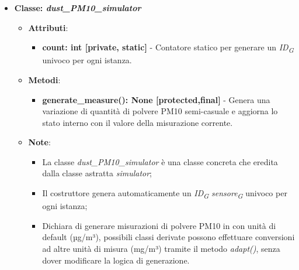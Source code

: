 \begin{itemize}
    \item{\textbf{Classe: \textit{dust\_PM10\_simulator}}}
    \begin{itemize}
        \item \textbf{Attributi}: 
        \begin{itemize}
            \item \textbf{count: int [private, static]} - Contatore statico per generare un \textit{ID}\textsubscript{\textit{G}} univoco per ogni istanza.
        \end{itemize}
        \item \textbf{Metodi}: 
        \begin{itemize}
            \item \textbf{generate\_measure(): None [protected,final]} - Genera una variazione di quantità di polvere PM10 semi-casuale e aggiorna lo stato interno con il valore della misurazione corrente.
        \end{itemize}
        \item \textbf{Note}:
        \begin{itemize}
            \item La classe \textit{dust\_PM10\_simulator} è una classe concreta che eredita dalla classe astratta \textit{simulator};
            \item Il costruttore genera automaticamente un \textit{ID}\textsubscript{\textit{G}} \textit{sensore}\textsubscript{\textit{G}} univoco per ogni istanza;
            \item Dichiara di generare misurazioni di polvere PM10 in con unità di default (µg/m³), possibili classi derivate possono effettuare conversioni ad altre unità di misura (mg/m³) tramite il metodo \textit{adapt()}, senza dover modificare la logica di generazione.
        \end{itemize}
    \end{itemize}


\end{itemize}
